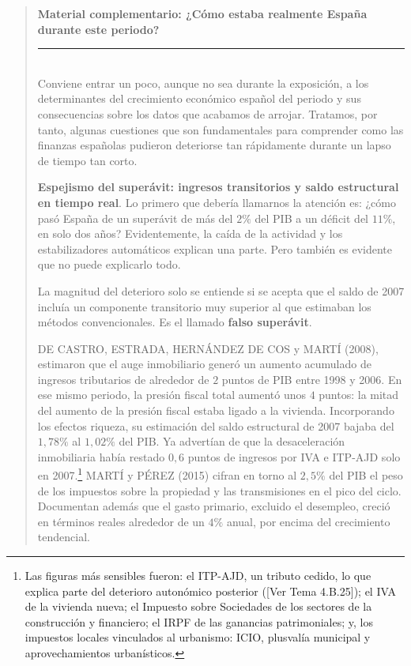 \documentclass[10pt,a4paper]{article}
\newenvironment{specialblock}[1]{%
      \begin{quote} %
      \small %
      \noindent\textbf{#1}\\[-0.3em] %
      \rule{\linewidth}{0.4pt}\\[0.6em]}{
      \end{quote}}
\newcommand{\authorfont}[1]{{\fontfamily{EBGaramond-TLF}\selectfont #1}}
\begin{document}
\begin{specialblock}{\textbf{Material complementario:} ¿Cómo estaba \textbf{realmente} España durante este periodo?}
    Conviene entrar un poco, aunque no sea durante la exposición, a los determinantes del crecimiento económico español del periodo y sus consecuencias sobre los datos que acabamos de arrojar. Tratamos, por tanto, algunas cuestiones que son fundamentales para comprender como las finanzas españolas pudieron deteriorse tan rápidamente durante un lapso de tiempo tan corto.

    \textbf{Espejismo del superávit: ingresos transitorios y saldo estructural en tiempo real}. Lo primero que debería llamarnos la atención es: ¿cómo pasó España de un superávit de más del $2\%$ del PIB a un déficit del $11\%$, en solo dos años? Evidentemente, la caída de la actividad y los estabilizadores automáticos explican una parte. Pero también es evidente que no puede explicarlo todo.
    
    La magnitud del deterioro solo se entiende si se acepta que el saldo de 2007 incluía un componente transitorio muy superior al que estimaban los métodos convencionales. Es el llamado \textbf{falso superávit}.

    DE CASTRO, ESTRADA, HERNÁNDEZ DE COS y MARTÍ (2008), estimaron que el auge inmobiliario generó un aumento acumulado de ingresos tributarios de alrededor de $2$ puntos de PIB entre 1998 y 2006. En ese mismo periodo, la presión fiscal total aumentó unos $4$ puntos: la mitad del aumento de la presión fiscal estaba ligado a la vivienda. Incorporando los efectos riqueza, su estimación del saldo estructural de 2007 bajaba del $1,78\%$ al $1,02\%$ del PIB. Ya advertían de que la desaceleración inmobiliaria había restado $0,6$ puntos de ingresos por IVA e ITP-AJD solo en 2007.\footnote{%
        Las figuras más sensibles fueron: el ITP-AJD, un tributo cedido, lo que explica parte del deterioro autonómico posterior ([\authorfont{Ver Tema 4.B.25}]); el IVA de la vivienda nueva; el Impuesto sobre Sociedades de los sectores de la construcción y financiero; el IRPF de las ganancias patrimoniales; y, los impuestos locales vinculados al urbanismo: ICIO, plusvalía municipal y aprovechamientos urbanísticos.
    } MARTÍ y PÉREZ (2015) cifran en torno al $2,5\%$ del PIB el peso de los impuestos sobre la propiedad y las transmisiones en el pico del ciclo. Documentan además que el gasto primario, excluido el desempleo, creció en términos reales alrededor de un $4\%$ anual, por encima del crecimiento tendencial.
    

\end{specialblock}
\end{document}
